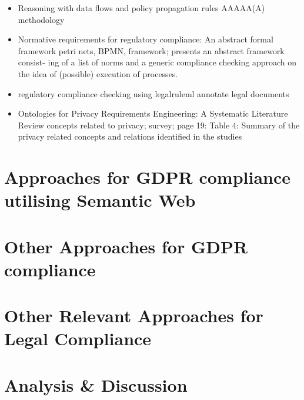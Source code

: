 \begin{itemize}
\item Reasoning with data flows and policy propagation rules \cite{daga_reasoning_2017} AAAAA(A) methodology
\item Normative requirements for regulatory compliance: An abstract formal framework \cite{hashmi_normative_2016} petri nets, BPMN, framework; presents an abstract framework consist- ing of a list of norms and a generic compliance checking approach on the idea of (possible) execution of processes.
\item regulatory compliance checking using legalruleml \cite{governatori_semantic_2016} annotate legal documents
\item Ontologies for Privacy Requirements Engineering: A Systematic Literature Review \cite{gharib_ontologies_2016} concepts related to privacy; survey; page 19: Table 4: Summary of the privacy related concepts and relations identified in the studies

\end{itemize}



\section{Approaches for GDPR compliance utilising Semantic Web}\label{sec:sota:gdpr-semweb}

\section{Other Approaches for GDPR compliance}\label{sec:sota:gdpr-other}

\section{Other Relevant Approaches for Legal Compliance}\label{sec:sota:other}

\section{Analysis \& Discussion}\label{sec:sota:analysis}